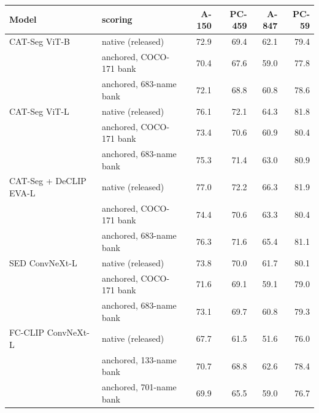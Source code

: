 \begin{tabular}{@{}llrrrr@{}}
\toprule
Model & scoring & A-150 & PC-459 & A-847 & PC-59 \\
\midrule
CAT-Seg ViT-B & native (released) & 72.9 & 69.4 & 62.1 & 79.4 \\
 & anchored, COCO-171 bank & 70.4 & 67.6 & 59.0 & 77.8 \\
 & anchored, 683-name bank & 72.1 & 68.8 & 60.8 & 78.6 \\
\midrule
CAT-Seg ViT-L & native (released) & 76.1 & 72.1 & 64.3 & 81.8 \\
 & anchored, COCO-171 bank & 73.4 & 70.6 & 60.9 & 80.4 \\
 & anchored, 683-name bank & 75.3 & 71.4 & 63.0 & 80.9 \\
\midrule
CAT-Seg + DeCLIP EVA-L & native (released) & 77.0 & 72.2 & 66.3 & 81.9 \\
 & anchored, COCO-171 bank & 74.4 & 70.6 & 63.3 & 80.4 \\
 & anchored, 683-name bank & 76.3 & 71.6 & 65.4 & 81.1 \\
\midrule
SED ConvNeXt-L & native (released) & 73.8 & 70.0 & 61.7 & 80.1 \\
 & anchored, COCO-171 bank & 71.6 & 69.1 & 59.1 & 79.0 \\
 & anchored, 683-name bank & 73.1 & 69.7 & 60.8 & 79.3 \\
\midrule
FC-CLIP ConvNeXt-L & native (released) & 67.7 & 61.5 & 51.6 & 76.0 \\
 & anchored, 133-name bank & 70.7 & 68.8 & 62.6 & 78.4 \\
 & anchored, 701-name bank & 69.9 & 65.5 & 59.0 & 76.7 \\
\bottomrule
\end{tabular}
